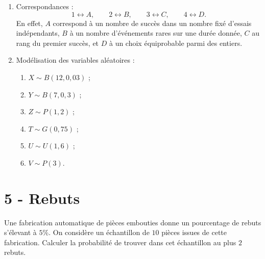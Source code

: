 {
    \begin{solution}
        \begin{enumerate}
            \item Correspondances :
            \[
            1 \leftrightarrow A,
            \qquad
            2 \leftrightarrow B,
            \qquad
            3 \leftrightarrow C,
            \qquad
            4 \leftrightarrow D.
            \]
            En effet, $A$ correspond \`a un nombre de succ\`es dans un nombre fix\'e d'essais ind\'ependants, $B$ \`a un nombre d'\'ev\'enements rares sur une dur\'ee donn\'ee, $C$ au rang du premier succ\`es, et $D$ \`a un choix \'equiprobable parmi des entiers.
            
            \item Mod\'elisation des variables al\'eatoires :
            \begin{enumerate}
                \item $X \sim B(12,0{,}03)$ ;
                \item $Y \sim B(7,0{,}3)$ ;
                \item $Z \sim P(1{,}2)$ ;
                \item $T \sim G(0{,}75)$ ;
                \item $U \sim U(1,6)$ ;
                \item $V \sim P(3)$.
            \end{enumerate}
            
        \end{enumerate}
    \end{solution}
}{}

\newpage

\section*{5 - Rebuts}
Une fabrication automatique de pièces embouties donne un pourcentage de rebuts s'élevant à $5 \%$. On considère un échantillon de $10$ pièces issues de cette fabrication. Calculer la probabilité de trouver dans cet échantillon au plus $2$ rebuts.


